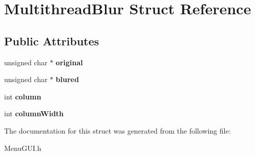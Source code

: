 \hypertarget{struct_multithread_blur}{\section{Multithread\-Blur Struct Reference}
\label{struct_multithread_blur}
}
\subsection*{Public Attributes}
\begin{DoxyCompactItemize}
\item 
\hypertarget{struct_multithread_blur_a8a803195909051e05fa32618e05b1e64}{unsigned char $\ast$ {\bfseries original}}\label{struct_multithread_blur_a8a803195909051e05fa32618e05b1e64}

\item 
\hypertarget{struct_multithread_blur_aacf83edba10020df1af733bbf8f54b09}{unsigned char $\ast$ {\bfseries blured}}\label{struct_multithread_blur_aacf83edba10020df1af733bbf8f54b09}

\item 
\hypertarget{struct_multithread_blur_aa52a296174c6ea22855a36cf99bc05c6}{int {\bfseries column}}\label{struct_multithread_blur_aa52a296174c6ea22855a36cf99bc05c6}

\item 
\hypertarget{struct_multithread_blur_a859493d5ce6fd4192a68cc9579c13065}{int {\bfseries column\-Width}}\label{struct_multithread_blur_a859493d5ce6fd4192a68cc9579c13065}

\end{DoxyCompactItemize}


The documentation for this struct was generated from the following file\-:\begin{DoxyCompactItemize}
\item 
Menu\-G\-U\-I.\-h\end{DoxyCompactItemize}
